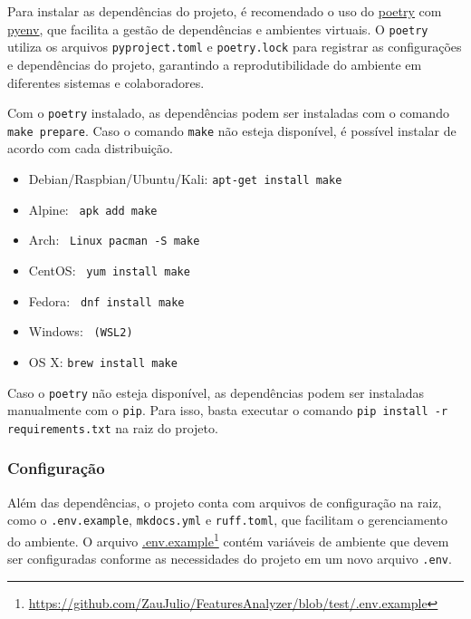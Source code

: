 Para instalar as dependências do projeto, é recomendado o uso do \href{https://python-poetry.org/docs/#installing-with-pipx}{\underline{poetry}} com \href{https://github.com/pyenv/pyenv?tab=readme-ov-file#installation}{\underline{pyenv}}, que facilita a gestão de dependências e ambientes virtuais. O \texttt{poetry} utiliza os arquivos \texttt{pyproject.toml} e \texttt{poetry.lock} para registrar as configurações e dependências do projeto, garantindo a reprodutibilidade do ambiente em diferentes sistemas e colaboradores.

Com o \texttt{poetry} instalado, as dependências podem ser instaladas com o comando \verb|make prepare|. Caso o comando \texttt{make} não esteja disponível, é possível instalar de acordo com cada distribuição.

\begin{itemize}
    \item Debian/Raspbian/Ubuntu/Kali: \verb|apt-get install make|
    \item Alpine: \verb| apk add make|
    \item Arch: \verb| Linux pacman -S make|
    \item CentOS: \verb| yum install make|
    \item Fedora: \verb| dnf install make|
    \item Windows: \verb| (WSL2)|
    \item OS X: \verb|brew install make|
\end{itemize}

Caso o \texttt{poetry} não esteja disponível, as dependências podem ser instaladas manualmente com o \texttt{pip}. Para isso, basta executar o comando \verb|pip install -r requirements.txt| na raiz do projeto.

\subsubsection{Configuração}
\label{subsec:3:configuracao}

\newcommand\urlEnv{https://github.com/ZauJulio/FeaturesAnalyzer/blob/test/.env.example}

Além das dependências, o projeto conta com arquivos de configuração na raiz, como o \texttt{.env.example}, \texttt{mkdocs.yml} e \texttt{ruff.toml}, que facilitam o gerenciamento do ambiente. O arquivo \href{\urlEnv}{\underline{.env.example}}\footnote{\url{\urlEnv}} contém variáveis de ambiente que devem ser configuradas conforme as necessidades do projeto em um novo arquivo \texttt{.env}.

